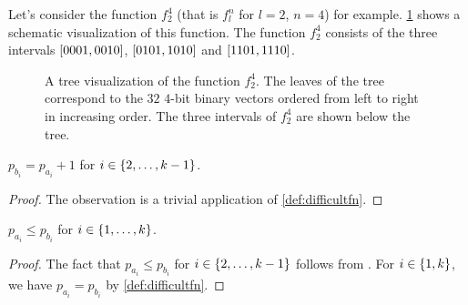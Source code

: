 \begin{example}
Let's consider the function $f_2^4$
(that is $f_l^n$ for $l=2$, $n=4$)
for example.
\cref{fig:f24} shows a schematic visualization
of this function.
The function $f_2^4$ consists of the three intervals
$[0001, 0010]$, $[0101, 1010]$
and $[1101, 1110]$.

\begin{figure}[h]
\centering

\caption[A tree visualization of the function $f_2^4$]
{A tree visualization of the function $f_2^4$.
The leaves of the tree correspond to the $32$ $4$-bit binary vectors ordered from left to right in increasing order.
The three intervals of $f_2^4$ are shown below the tree.}
\label{fig:f24}
\end{figure}
\end{example}


\begin{observation}
\label{observation:difficultaibi}
$p_{b_i} = p_{a_i} + 1$
for $i \in \{2, \ldots, k-1\}$.
\end{observation}

\begin{proof}
The observation is a trivial application
of \cref{def:difficultfn}.
\end{proof}

\begin{observation}
\label{observation:difficultineqab}
$p_{a_i} \leq p_{b_i}$ for $i \in \{1, \ldots, k\}$.
\end{observation}

\begin{proof}
The fact that
$p_{a_i} \leq p_{b_i}$ for $i \in \{2, \ldots, k-1\}$
follows from .
For $i \in \{1, k\}$,
we have $p_{a_i} = p_{b_i}$
by \cref{def:difficultfn}.
\end{proof}

